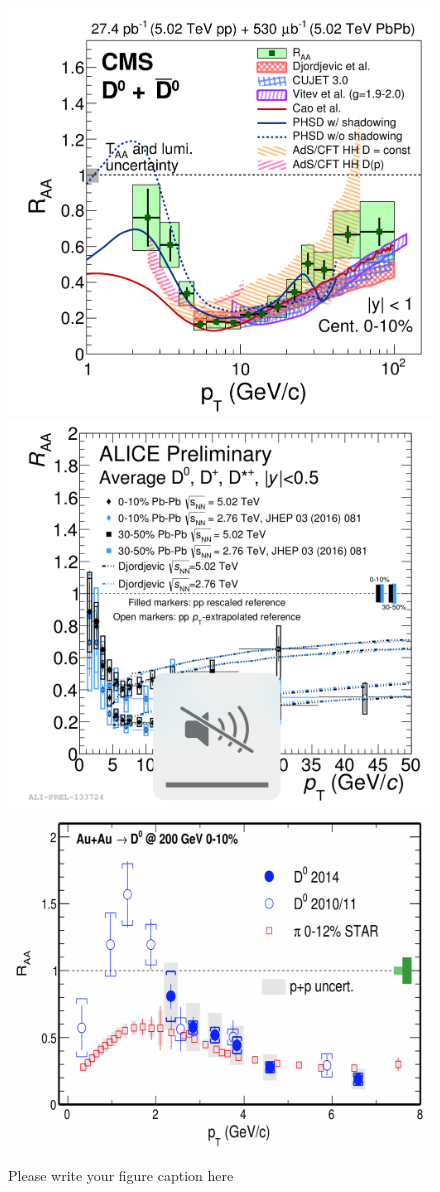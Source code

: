 \documentclass{webofc}
\begin{document}
\begin{figure}[ht]
\centering
\includegraphics[width=.30\textwidth]{Plots/DRAACMS010}
\includegraphics[width=.30\textwidth]{Plots/DRAAALICECentrality502}
\includegraphics[width=.37\textwidth]{Plots/DRAASTARAuAu}
\caption{Please write your figure caption here}
\label{DRAA}     
\end{figure}
\end{document}
